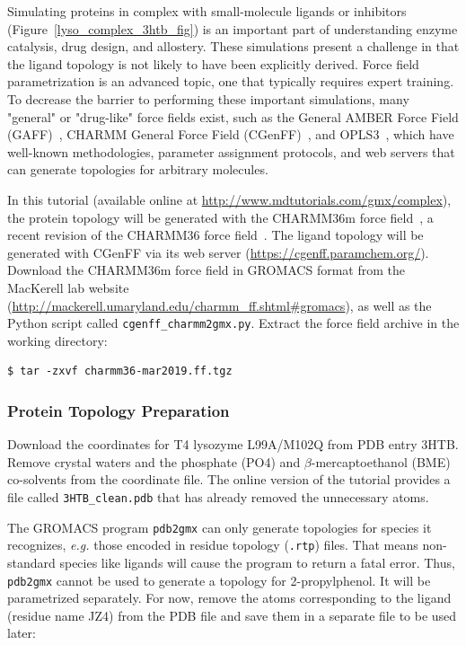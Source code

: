 \documentclass[9pt,tutorial,pubversion]{livecoms}
\newcommand{\urlstring}{http://www.mdtutorials.com/gmx}
\newcommand{\tutorialcomplex}{\url{\urlstring/complex}}
\begin{document}
Simulating proteins in complex with small-molecule ligands or inhibitors (Figure~\ref{lyso_complex_3htb_fig}) is an important part of understanding enzyme catalysis, drug design, and allostery. These simulations present a challenge in that the ligand topology is not likely to have been explicitly derived. Force field parametrization is an advanced topic, one that typically requires expert training. To decrease the barrier to performing these important simulations, many "general" or "drug-like" force fields exist, such as the General AMBER Force Field (GAFF)~\cite{Wang2004}, CHARMM General Force Field (CGenFF)~\cite{Vanommeslaeghe2010}, and OPLS3~\cite{Harder2016}, which have well-known methodologies, parameter assignment protocols, and web servers that can generate topologies for arbitrary molecules.

In this tutorial (available online at \tutorialcomplex), the protein topology will be generated with the CHARMM36m force field~\cite{Huang2016}, a recent revision of the CHARMM36 force field~\cite{Best2012}. The ligand topology will be generated with CGenFF via its web server (\url{https://cgenff.paramchem.org/}). Download the CHARMM36m force field in GROMACS format from the MacKerell lab website (\url{http://mackerell.umaryland.edu/charmm_ff.shtml#gromacs}), as well as the Python script called \texttt{cgenff\_charmm2gmx.py}. Extract the force field archive in the working directory:

\begin{lstlisting}
$ tar -zxvf charmm36-mar2019.ff.tgz
\end{lstlisting}

\subsubsection{Protein Topology Preparation} \label{complex_top}

Download the coordinates for T4 lysozyme L99A/M102Q from PDB entry 3HTB. Remove crystal waters and the phosphate (PO4) and $\beta$-mercaptoethanol (BME) co-solvents from the coordinate file. The online version of the tutorial provides a file called \texttt{3HTB\_clean.pdb} that has already removed the unnecessary atoms.

The GROMACS program \texttt{pdb2gmx} can only generate topologies for species it recognizes, {\em e.g.} those encoded in residue topology (\texttt{.rtp}) files. That means non-standard species like ligands will cause the program to return a fatal error. Thus, \texttt{pdb2gmx} cannot be used to generate a topology for 2-propylphenol. It will be parametrized separately. For now, remove the atoms corresponding to the ligand (residue name JZ4) from the PDB file and save them in a separate file to be used later:
\end{document}

